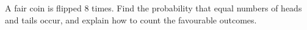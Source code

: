 A fair coin is flipped $8$ times. Find the probability that equal numbers of heads and tails occur, and explain how to count the favourable outcomes.
